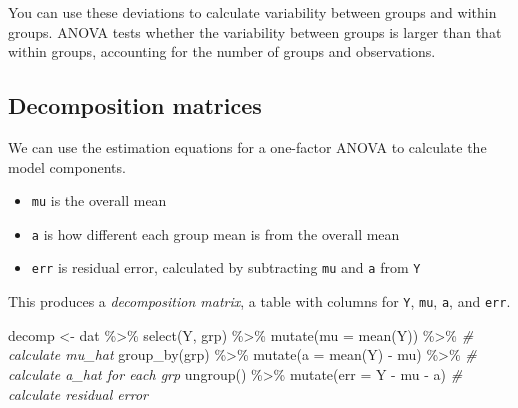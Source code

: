 \documentclass[
  oneside]{book}
\newenvironment{Shaded}{\begin{snugshade}}{\end{snugshade}}
\newcommand{\AttributeTok}[1]{\textcolor[rgb]{0.77,0.63,0.00}{#1}}
\newcommand{\CommentTok}[1]{\textcolor[rgb]{0.56,0.35,0.01}{\textit{#1}}}
\newcommand{\FunctionTok}[1]{\textcolor[rgb]{0.00,0.00,0.00}{#1}}
\newcommand{\NormalTok}[1]{#1}
\newcommand{\OtherTok}[1]{\textcolor[rgb]{0.56,0.35,0.01}{#1}}
\newcommand{\SpecialCharTok}[1]{\textcolor[rgb]{0.00,0.00,0.00}{#1}}
\providecommand{\tightlist}{%
  \setlength{\itemsep}{0pt}\setlength{\parskip}{0pt}}
\begin{document}
You can use these deviations to calculate variability between groups and within groups. ANOVA tests whether the variability between groups is larger than that within groups, accounting for the number of groups and observations.

\hypertarget{decomp}{%
\subsection{Decomposition matrices}\label{decomp}}

We can use the estimation equations for a one-factor ANOVA to calculate the model components.

\begin{itemize}
\tightlist
\item
  \texttt{mu} is the overall mean
\item
  \texttt{a} is how different each group mean is from the overall mean
\item
  \texttt{err} is residual error, calculated by subtracting \texttt{mu} and \texttt{a} from \texttt{Y}
\end{itemize}

This produces a \emph{decomposition matrix}, a table with columns for \texttt{Y}, \texttt{mu}, \texttt{a}, and \texttt{err}.

\begin{Shaded}
\begin{Highlighting}[]
\NormalTok{decomp }\OtherTok{\textless{}{-}}\NormalTok{ dat }\SpecialCharTok{\%\textgreater{}\%} 
  \FunctionTok{select}\NormalTok{(Y, grp) }\SpecialCharTok{\%\textgreater{}\%}
  \FunctionTok{mutate}\NormalTok{(}\AttributeTok{mu =} \FunctionTok{mean}\NormalTok{(Y)) }\SpecialCharTok{\%\textgreater{}\%}     \CommentTok{\# calculate mu\_hat}
  \FunctionTok{group\_by}\NormalTok{(grp) }\SpecialCharTok{\%\textgreater{}\%}
  \FunctionTok{mutate}\NormalTok{(}\AttributeTok{a =} \FunctionTok{mean}\NormalTok{(Y) }\SpecialCharTok{{-}}\NormalTok{ mu) }\SpecialCharTok{\%\textgreater{}\%} \CommentTok{\# calculate a\_hat for each grp}
  \FunctionTok{ungroup}\NormalTok{() }\SpecialCharTok{\%\textgreater{}\%}
  \FunctionTok{mutate}\NormalTok{(}\AttributeTok{err =}\NormalTok{ Y }\SpecialCharTok{{-}}\NormalTok{ mu }\SpecialCharTok{{-}}\NormalTok{ a)     }\CommentTok{\# calculate residual error}
\end{Highlighting}
\end{Shaded}
\end{document}
